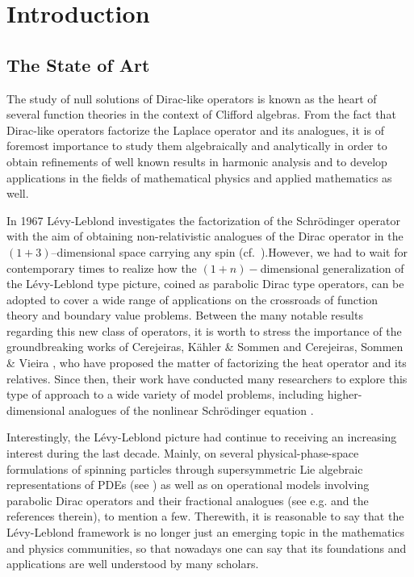 \documentclass{elsarticle}
\begin{document}


\section{Introduction}



\subsection{The State of Art}
The study of null solutions of Dirac-like operators is known as the heart of several function theories in the context of Clifford algebras. From the fact that Dirac-like operators factorize the Laplace operator and its analogues, it is of foremost importance to study them algebraically and analytically in order to obtain refinements of well known results in harmonic analysis and to develop applications in the fields of mathematical physics and applied mathematics as well.

In 1967 L\'evy-Leblond investigates the factorization of the Schr\"odinger operator with the aim of obtaining non-relativistic analogues of the Dirac operator in the $(1+3)$--dimensional space carrying any spin (cf.~\cite{LevyLeblond67}).However, we had to wait for contemporary times to realize how the $(1+n)-$dimensional generalization of the L\'evy-Leblond type picture, coined as parabolic Dirac type operators, can be adopted to cover a wide range of applications on the crossroads of function theory and boundary value problems. Between the many notable results regarding this new class of operators, it is worth to stress the importance of the groundbreaking works of Cerejeiras, K\"ahler \& Sommen \cite{CKS05} and Cerejeiras, Sommen \& Vieira \cite{CSV07}, who have proposed the matter of factorizing the heat operator and its relatives. Since then, their work have conducted many researchers to explore this type of approach to a wide variety of model problems, including higher-dimensional analogues of the nonlinear Schr\"odinger equation \cite{B06,CFV08}.

Interestingly, the L\'evy-Leblond picture had continue to receiving an increasing interest during the last decade. Mainly, on several physical-phase-space formulations of spinning particles through supersymmetric Lie algebraic representations of PDEs (see \cite{AKTT16,A18}) as well as on operational models involving parabolic Dirac operators and their fractional analogues (see e.g. \cite{FV16,FV17,BCBM20,BRS20} and the references therein), to mention a few. Therewith, it is reasonable to say that the L\'evy-Leblond framework is no longer just an emerging topic in the mathematics and physics communities, so that nowadays one can say that its foundations and applications are well understood by many scholars.
\end{document}

